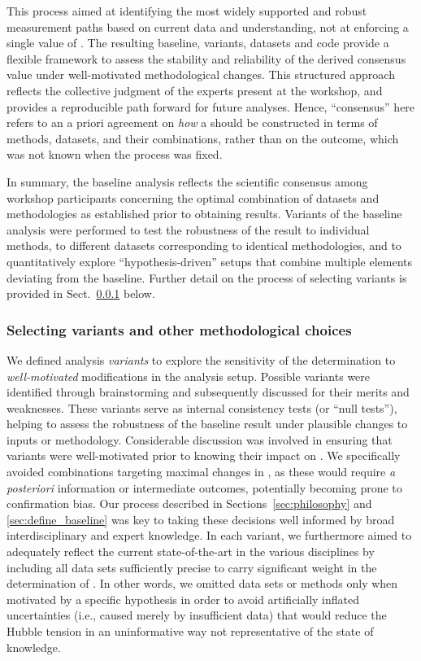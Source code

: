 This process aimed at identifying the most widely supported and robust measurement paths based on current data and understanding, not at enforcing a single value of \Hcst. The resulting baseline, variants, datasets and code provide a flexible framework to assess the stability and reliability of the derived consensus {\Hcst} value under well-motivated methodological changes. This structured approach reflects the collective judgment of the experts present at the workshop, and provides a reproducible path forward for future analyses. Hence, ``consensus'' here refers to an a priori agreement on \emph{how} a {\DN} should be constructed in terms of methods, datasets, and their combinations, rather than on the outcome, which was not known when the process was fixed.

In summary, the baseline analysis reflects the scientific consensus among workshop participants concerning the optimal combination of datasets and methodologies as established prior to obtaining results. Variants of the baseline analysis were performed to test the robustness of the result to individual methods, to different datasets corresponding to identical methodologies, and to quantitatively explore ``hypothesis-driven'' setups that combine multiple elements deviating from the baseline. Further detail on the process of selecting variants is provided in Sect.~\ref{sec:select_variants} below.

\subsubsection{Selecting variants and other methodological choices }\label{sec:select_variants}

We defined analysis \emph{variants} to explore the sensitivity of the {\Hcst} determination to {\it well-motivated} modifications in the analysis setup. Possible variants were identified through brainstorming and subsequently discussed for their merits and weaknesses. These variants serve as internal consistency tests (or ``null tests''), helping to assess the robustness of the baseline result under plausible changes to inputs or methodology. Considerable discussion was involved in ensuring that variants were well-motivated prior to knowing their impact on \Hcst{}. We specifically avoided combinations targeting maximal changes in \Hcst{}, as these would require {\it a posteriori} information or intermediate outcomes, potentially becoming prone to confirmation bias. Our process described in Sections~\ref{sec:philosophy} and \ref{sec:define_baseline} was key to taking these decisions well informed by broad interdisciplinary and expert knowledge. In each variant, we furthermore aimed to adequately reflect the current state-of-the-art in the various disciplines by including all data sets sufficiently precise to carry significant weight in the determination of \Hcst{}. In other words, we omitted data sets or methods only when motivated by a specific hypothesis in order to avoid artificially inflated uncertainties (i.e., caused merely by insufficient data) that would reduce the Hubble tension in an uninformative way not representative of the state of knowledge.

